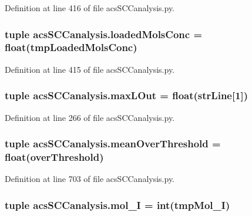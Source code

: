 Definition at line 416 of file acs\-S\-C\-Canalysis.\-py.

\hypertarget{a00096_abe83f5e0ae3bd65da15a697a979aeea1}{
\subsubsection[{loaded\-Mols\-Conc}]{\setlength{\rightskip}{0pt plus 5cm}tuple acs\-S\-C\-Canalysis.\-loaded\-Mols\-Conc = float(tmp\-Loaded\-Mols\-Conc)}}\label{a00096_abe83f5e0ae3bd65da15a697a979aeea1}


Definition at line 415 of file acs\-S\-C\-Canalysis.\-py.

\hypertarget{a00096_a47da7b9153a0e4a33512f6d2675b8c1a}{
\subsubsection[{max\-L\-Out}]{\setlength{\rightskip}{0pt plus 5cm}tuple acs\-S\-C\-Canalysis.\-max\-L\-Out = float({\bf str\-Line}\mbox{[}1\mbox{]})}}\label{a00096_a47da7b9153a0e4a33512f6d2675b8c1a}


Definition at line 266 of file acs\-S\-C\-Canalysis.\-py.

\hypertarget{a00096_af10c3623be709892f4bdc4df5a3d52b0}{
\subsubsection[{mean\-Over\-Threshold}]{\setlength{\rightskip}{0pt plus 5cm}tuple acs\-S\-C\-Canalysis.\-mean\-Over\-Threshold = float({\bf over\-Threshold})}}\label{a00096_af10c3623be709892f4bdc4df5a3d52b0}


Definition at line 703 of file acs\-S\-C\-Canalysis.\-py.

\hypertarget{a00096_ae13d6607ffa236891a9af05bfa88cfcc}{
\subsubsection[{mol\-\_\-\-I}]{\setlength{\rightskip}{0pt plus 5cm}tuple acs\-S\-C\-Canalysis.\-mol\-\_\-\-I = int(tmp\-Mol\-\_\-\-I)}}\label{a00096_ae13d6607ffa236891a9af05bfa88cfcc}


